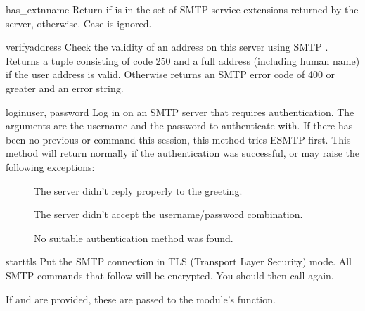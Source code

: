 \begin{methoddesc}{has_extn}{name}
Return  if  is in the set of SMTP service
extensions returned by the server,  otherwise.
Case is ignored.
\end{methoddesc}

\begin{methoddesc}{verify}{address}
Check the validity of an address on this server using SMTP .
Returns a tuple consisting of code 250 and a full  address
(including human name) if the user address is valid. Otherwise returns
an SMTP error code of 400 or greater and an error string.

\end{methoddesc}

\begin{methoddesc}{login}{user, password}
Log in on an SMTP server that requires authentication.
The arguments are the username and the password to authenticate with.
If there has been no previous  or  command this
session, this method tries ESMTP  first.
This method will return normally if the authentication was successful,
or may raise the following exceptions:

\begin{description}
  \item[]
    The server didn't reply properly to the  greeting.
  \item[]
    The server didn't accept the username/password combination.
  \item[]
    No suitable authentication method was found.
\end{description}
\end{methoddesc}

\begin{methoddesc}{starttls}{}
Put the SMTP connection in TLS (Transport Layer Security) mode.  All
SMTP commands that follow will be encrypted.  You should then call
 again.

If  and  are provided, these are passed to
the  module's  function.
\end{methoddesc}


